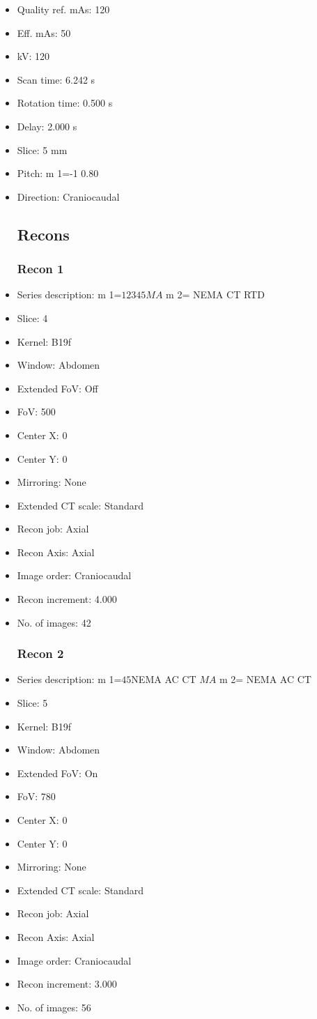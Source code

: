 \documentclass[12pt]{article}
\begin{document}
\begin{itemize}
\subsection{Scan}
\item Quality ref. mAs: 120\item Eff. mAs: 50\item kV: 120\item Scan time: 6.242 s\item Rotation time: 0.500 s\item Delay: 2.000 s\item Slice: 5 mm\item Pitch: m 1=-1 0.80\item Direction: Craniocaudal\subsection{Recons}

\subsubsection{Recon 1}
\item Series description: m 1=$1$$2$$3$$4$$5$$M$$A$ m 2= NEMA CT RTD
\item Slice: 4
\item Kernel: B19f
\item Window: Abdomen
\item Extended FoV: Off
\item FoV: 500
\item Center X: 0
\item Center Y: 0
\item Mirroring: None
\item Extended CT scale: Standard
\item Recon job: Axial
\item Recon Axis: Axial
\item Image order: Craniocaudal
\item Recon increment: 4.000
\item No. of images: 42
\subsubsection{Recon 2}
\item Series description: m 1=$4$$5$NEMA AC CT $M$$A$ m 2= NEMA AC CT
\item Slice: 5
\item Kernel: B19f
\item Window: Abdomen
\item Extended FoV: On
\item FoV: 780
\item Center X: 0
\item Center Y: 0
\item Mirroring: None
\item Extended CT scale: Standard
\item Recon job: Axial
\item Recon Axis: Axial
\item Image order: Craniocaudal
\item Recon increment: 3.000
\item No. of images: 56

\end{itemize}
\end{document}

